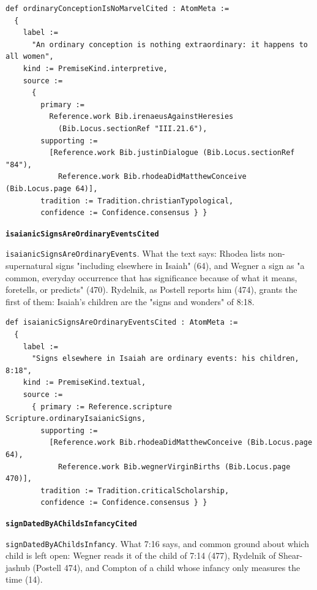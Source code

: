 \documentclass[11pt]{article}
\begin{document}
{\small\begin{verbatim}
def ordinaryConceptionIsNoMarvelCited : AtomMeta :=
  {
    label :=
      "An ordinary conception is nothing extraordinary: it happens to all women",
    kind := PremiseKind.interpretive,
    source :=
      {
        primary :=
          Reference.work Bib.irenaeusAgainstHeresies
            (Bib.Locus.sectionRef "III.21.6"),
        supporting :=
          [Reference.work Bib.justinDialogue (Bib.Locus.sectionRef "84"),
            Reference.work Bib.rhodeaDidMatthewConceive (Bib.Locus.page 64)],
        tradition := Tradition.christianTypological,
        confidence := Confidence.consensus } }
\end{verbatim}}
\par\medskip\noindent\textbf{\texttt{isaianic\allowbreak{}Signs\allowbreak{}Are\allowbreak{}Ordinary\allowbreak{}Events\allowbreak{}Cited}}\par\nobreak\noindent
\texttt{isaianic\allowbreak{}Signs\allowbreak{}Are\allowbreak{}Ordinary\allowbreak{}Events}. What the text says: Rhodea lists non-supernatural signs "including elsewhere in Isaiah" (64), and Wegner a sign as "a common, everyday occurrence that has significance because of what it means, foretells, or predicts" (470). Rydelnik, as Postell reports him (474), grants the first of them: Isaiah's children are the "signs and wonders" of 8:18.

{\small\begin{verbatim}
def isaianicSignsAreOrdinaryEventsCited : AtomMeta :=
  {
    label :=
      "Signs elsewhere in Isaiah are ordinary events: his children, 8:18",
    kind := PremiseKind.textual,
    source :=
      { primary := Reference.scripture Scripture.ordinaryIsaianicSigns,
        supporting :=
          [Reference.work Bib.rhodeaDidMatthewConceive (Bib.Locus.page 64),
            Reference.work Bib.wegnerVirginBirths (Bib.Locus.page 470)],
        tradition := Tradition.criticalScholarship,
        confidence := Confidence.consensus } }
\end{verbatim}}
\par\medskip\noindent\textbf{\texttt{sign\allowbreak{}Dated\allowbreak{}By\allowbreak{}AChilds\allowbreak{}Infancy\allowbreak{}Cited}}\par\nobreak\noindent
\texttt{sign\allowbreak{}Dated\allowbreak{}By\allowbreak{}AChilds\allowbreak{}Infancy}. What 7:16 says, and common ground about which child is left open: Wegner reads it of the child of 7:14 (477), Rydelnik of Shear-jashub (Postell 474), and Compton of a child whose infancy only measures the time (14).
\end{document}

